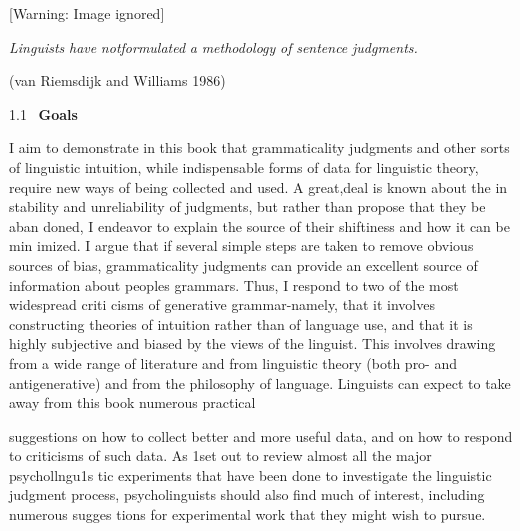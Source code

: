 \begin{center}
 [Warning: Image ignored] %

\end{center}
\begin{styleStandard}
\textit{Linguists}\textit{ }\textit{have}\textit{ }\textit{notformulated}\textit{ }\textit{a}\textit{ }\textit{{\textquotedbl}methodology}\textit{ }\textit{of}\textit{ }\textit{sentence}\textit{ }\textit{judgments.}\textit{ }\textit{{\textquotedbl}}
\end{styleStandard}


\begin{styleStandard}
(van Riemsdijk and Williams 1986)
\end{styleStandard}


\begin{styleStandard}
1.1 \ \textbf{Goals}
\end{styleStandard}


\begin{styleStandard}
I aim to demonstrate in this book that grammaticality judgments and other sorts of linguistic intuition, while indispensable forms of data for linguistic theory, require new ways of being collected and used. A great,deal is known about the in\- stability and unreliability of judgments, but rather than propose that they be aban\- doned, I endeavor to explain the source of their shiftiness and how it can be min\- imized. I argue that if several simple steps are taken to remove obvious sources of bias, grammaticality judgments can provide an excellent source of information about people{\textquotesingle}s grammars. Thus, I respond to two of the most widespread criti\- cisms of generative grammar-namely, that it involves constructing theories of intuition rather than of language use, and that it is highly subjective and biased by the views of the linguist. This involves drawing from a wide range of literature and from linguistic theory (both pro- and antigenerative) and from the philosophy of language. Linguists can expect to take away from this book numerous practical
\end{styleStandard}


\begin{styleStandard}
suggestions on how to collect better and more useful data, and on how to respond to criticisms of such data. As 1set out to review almost all the major psychollngu1s\- tic experiments that have been done to investigate the linguistic judgment process, psycholinguists should also find much of interest, including numerous sugges\- tions for experimental work that they might wish to pursue.
\end{styleStandard}


